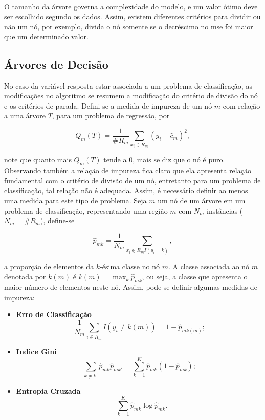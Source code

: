 O tamanho da árvore governa a complexidade do modelo, e um valor ótimo deve ser escolhido segundo os dados. Assim, existem diferentes critérios para dividir ou não um nó, por exemplo, divida o nó somente se o decréscimo no mse foi maior que um determinado valor.


\subsection{Árvores de Decisão}

No caso da variável resposta estar associada a um problema de classificação, as modificações no algoritmo se resumem a modificação do critério de divisão do nó e os critérios de parada. Defini-se a medida de impureza de um nó $m$ com relação a uma árvore $T$, para um problema de regressão, por

\begin{equation}
Q_m(T)=\frac{1}{\#R_m}\sum_{x_i\in{R_m}}(y_i-\hat{c}_m)^2\mbox{,}~
\end{equation}

note que quanto mais $Q_m(T)$ tende a $0$, mais se diz que o nó é puro. Observando também a relação de impureza fica claro que ela apresenta relação fundamental com o critério de divisão de um nó, entretanto para um problema de classificação, tal relação não é adequada. Assim, é necessário definir ao menos uma medida para este tipo de problema. Seja $m$ um nó de um árvore em um problema de classificação, representando uma região $m$ com $N_m$ instâncias ($N_m=\#R_m$), define-se

\begin{equation}
\hat{p}_{mk}=\frac{1}{N_m}\sum_{x_i\in{R_m}I(y_i=k)}\mbox{,}~
\end{equation}

a proporção de elementos da $k$-ésima classe no nó $m$. A classe associada ao nó $m$ denotada por $k(m)$ é $k(m)=\max_k\hat{p}_{mk}$, ou seja, a classe que apresenta o maior número de elementos neste nó. Assim, pode-se definir algumas medidas de impureza:

\begin{itemize}
\item {\bf Erro de Classificação}
\begin{equation}
\frac{1}{N_m}\sum_{i\in{R_m}}I(y_i\neq{k}(m))=1-\hat{p}_{mk(m)}\mbox{;}
\end{equation}
\item {\bf Indice Gini}
\begin{equation}
\sum_{k\neq{k}'}\hat{p}_{mk}\hat{p}_{mk'}=\sum_{k=1}^{K}\hat{p}_{mk}(1-\hat{p}_{mk})\mbox{;}
\end{equation}
\item {\bf Entropia Cruzada}
\begin{equation}
-\sum_{k=1}^K\hat{p}_{mk}\log\hat{p}_{mk}\mbox{.}
\end{equation}
\end{itemize}


